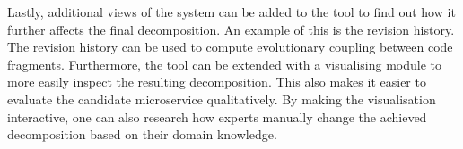 Lastly, additional views of the system can be added to the tool to find out how it further affects the final decomposition. An example of this is the revision history. The revision history can be used to compute evolutionary coupling between code fragments. Furthermore, the tool can be extended with a visualising module to more easily inspect the resulting decomposition. This also makes it easier to evaluate the candidate microservice qualitatively. By making the visualisation  interactive, one can also research how experts manually change the achieved decomposition based on their domain knowledge.